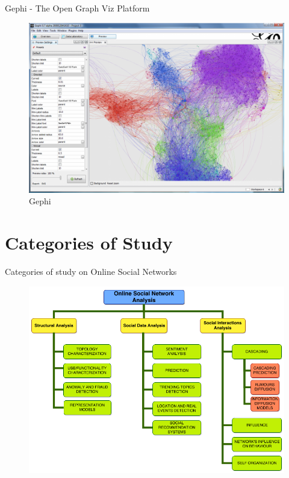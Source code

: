 \documentclass[8pt]{beamer}
\begin{document}
  \begin{frame}{Gephi - The Open Graph Viz Platform}
  	\begin{figure}
  		\includegraphics[scale=0.25]{asset/tools-gephi.png}
  		\caption{Gephi}
  	\end{figure}
  \end{frame}

  \section{Categories of Study}
  \begin{frame}{Categories of study on Online Social Networks}
    \begin{figure}
    	\includegraphics[scale=0.35]{asset/overview.png}
    \end{figure}
  \end{frame}
  
\end{document}
